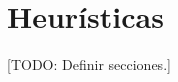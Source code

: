 \documentclass{subfiles}
\begin{document}
  \chapter{Heurísticas}
  \label{chap:heuristics}

    [TODO: Definir secciones.]
\end{document}
